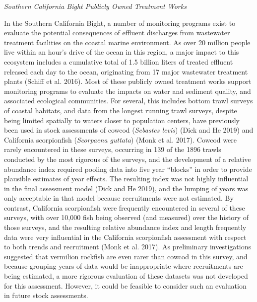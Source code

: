 \documentclass[11pt,
  english,
]{article}
\begin{document}
\emph{Southern California Bight Publicly Owned Treatment Works}

In the Southern California Bight, a number of monitoring programs exist to evaluate the potential consequences of effluent discharges from wastewater treatment facilities on the coastal marine environment. As over 20 million people live within an hour's drive of the ocean in this region, a major impact to this ecosystem includes a cumulative total of 1.5 billion liters of treated effluent released each day to the ocean, originating from 17 major wastewater treatment plants {(Schiff et al. 2016)\leavevmode\tagmcend\tagstructend}. Most of these publicly owned treatment works support monitoring programs to evaluate the impacts on water and sediment quality, and associated ecological communities. For several, this includes bottom trawl surveys of coastal habitats, and data from the longest running trawl surveys, despite being limited spatially to waters closer to population centers, have previously been used in stock assessments of cowcod (\emph{Sebastes levis}) {(Dick and He 2019)\leavevmode\tagmcend\tagstructend} and California scorpionfish (\emph{Scorpaena guttata}) {(Monk et al. 2017)\leavevmode\tagmcend\tagstructend}. Cowcod were rarely encountered in these surveys, occurring in 139 of the 1896 trawls conducted by the most rigorous of the surveys, and the development of a relative abundance index required pooling data into five year ``blocks'' in order to provide plausible estimates of year effects. The resulting index was not highly influential in the final assessment model {(Dick and He 2019)\leavevmode\tagmcend\tagstructend}, and the lumping of years was only acceptable in that model because recruitments were not estimated. By contrast, California scorpionfish were frequently encountered in several of these surveys, with over 10,000 fish being observed (and measured) over the history of those surveys, and the resulting relative abundance index and length frequently data were very influential in the California scorpionfish assessment with respect to both trends and recruitment {(Monk et al. 2017)\leavevmode\tagmcend\tagstructend}. As preliminary investigations suggested that vermilion rockfish are even rarer than cowcod in this survey, and because grouping years of data would be inappropriate where recruitments are being estimated, a more rigorous evaluation of these datasets was not developed for this assessment. However, it could be feasible to consider such an evaluation in future stock assessments.
\end{document}
